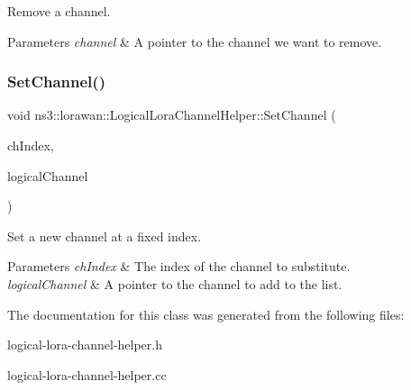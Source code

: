 Remove a channel.


\begin{DoxyParams}{Parameters}
{\em channel} & A pointer to the channel we want to remove. \\
\hline
\end{DoxyParams}
\mbox{\label{classns3_1_1lorawan_1_1LogicalLoraChannelHelper_a2d697320e188aba516348388b9d9e652}} 
\subsubsection{\texorpdfstring{Set\+Channel()}{SetChannel()}}
{\footnotesize\ttfamily void ns3\+::lorawan\+::\+Logical\+Lora\+Channel\+Helper\+::\+Set\+Channel (\begin{DoxyParamCaption}\item[{uint8\+\_\+t}]{ch\+Index,  }\item[{Ptr$<$ \hyperlink{classns3_1_1lorawan_1_1LogicalLoraChannel}{Logical\+Lora\+Channel} $>$}]{logical\+Channel }\end{DoxyParamCaption})}

Set a new channel at a fixed index.


\begin{DoxyParams}{Parameters}
{\em ch\+Index} & The index of the channel to substitute. \\
\hline
{\em logical\+Channel} & A pointer to the channel to add to the list. \\
\hline
\end{DoxyParams}


The documentation for this class was generated from the following files\+:\begin{DoxyCompactItemize}
\item 
logical-\/lora-\/channel-\/helper.\+h\item 
logical-\/lora-\/channel-\/helper.\+cc\end{DoxyCompactItemize}
